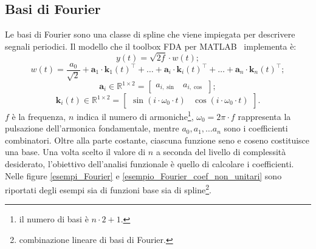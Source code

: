 \subsection[Basi di Fourier]{Basi di Fourier}
Le basi di Fourier sono una classe di spline che viene impiegata per descrivere segnali periodici. Il modello che il toolbox FDA per MATLAB~\cite{paper_FDA_toolbox} implementa è:
\begin{equation}
	y(t) = \sqrt{2f}\cdot w(t);
\end{equation}
\begin{equation}
	w(t) = \frac{a_0}{\sqrt{2}} + \mathbf{a}_1\cdot \mathbf{k}_1(t)^\top +\dots + \mathbf{a}_i\cdot \mathbf{k}_i(t)^\top + \dots + \mathbf{a}_n\cdot \mathbf{k}_n(t)^\top;
\end{equation}
\begin{equation}
	\mathbf{a}_i\in\mathbb{R}^{1\times2} =
	\begin{bmatrix}
		a_{i, \sin} & a_{i, \cos}
	\end{bmatrix};
\end{equation}
\begin{equation}
	\mathbf{k}_i(t)\in\mathbb{R}^{1\times 2} =
	\begin{bmatrix}
		\sin\left(i\cdot\omega_0\cdot t\right) & \cos\left(i\cdot\omega_0\cdot t\right)
	\end{bmatrix}.
\end{equation}
$f$ è la frequenza, $n$ indica il numero di armoniche\footnote{il numero di basi è $n\cdot 2 + 1$.}, $\omega_0 = 2\pi\cdot f$ rappresenta la pulsazione dell'armonica fondamentale, mentre $a_0, a_1,\dots a_n$ sono i coefficienti combinatori. Oltre alla parte costante, ciascuna funzione seno e coseno costituisce una base. Una volta scelto il valore di $n$ a seconda del livello di complessità desiderato, l'obiettivo dell'analisi funzionale è quello di calcolare i coefficienti. Nelle figure \ref{esempi_Fourier} e \ref{esempio_Fourier_coef_non_unitari} sono riportati degli esempi sia di funzioni base sia di spline\footnote{combinazione lineare di basi di Fourier.}.

